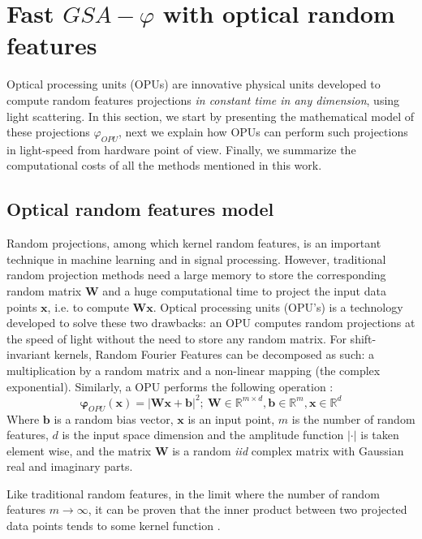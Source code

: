 \section{Fast $GSA-\varphi$ with optical random features}
\label{section:OPU}
Optical processing units (OPUs) are innovative physical units developed to compute random features projections \emph{in constant time in any dimension}, using light scattering. In this section, %
we start by presenting the mathematical model of these projections $\varphi_{OPU}$, next we explain how OPUs can perform such projections in light-speed from hardware point of view. Finally, we summarize the computational costs of all the methods mentioned in this work.

\subsection{Optical random features model}
Random projections, among which kernel random features, is an important technique in machine learning and in signal processing. However, traditional random projection methods need a large memory to store the corresponding random matrix $\mathbf{W}$ and a huge computational time to project the input data points $\mathbf{x}$, i.e. to compute $\mathbf{Wx}$. Optical processing units (OPU's) is a technology developed to solve these two drawbacks: an OPU computes random projections at the speed of light without the need to store any random matrix. For shift-invariant kernels, Random Fourier Features can be decomposed as such: a multiplication by a random matrix and a non-linear mapping (the complex exponential).
Similarly, a OPU performs the following operation \citep{saade_opu}:
\begin{equation}
\label{OPU_equation}
\mathbf{\varphi}_{OPU}(\mathbf{x})=|\mathbf{Wx+b}|^2 ;~\mathbf{W}\in \mathbb{R}^{m\times d},\mathbf{b}\in \mathbb{R}^m, \mathbf{x}\in \mathbb{R}^d
\end{equation}
Where $\mathbf{b}$ is a random bias vector, $\mathbf{x}$ is an input point, $m$ is the number of random features, $d$ is the input space dimension and the amplitude function $|\cdot|$ is taken element wise, and the matrix $\mathbf{W}$ is a random \emph{iid} complex matrix with Gaussian real and imaginary parts.

Like traditional random features, in the limit where the number of random features $m\xrightarrow{}\infty$, it can be proven that the inner product between two projected data points tends to some kernel function \citep{saade_opu}.


